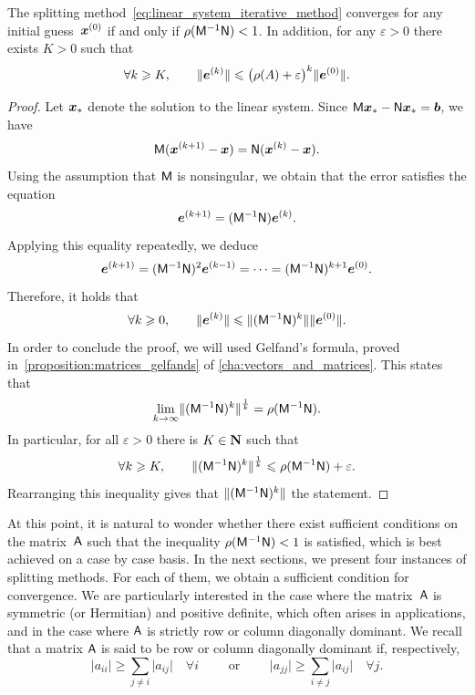 \begin{proposition}
    [Convergence]
    \label{proposition:linear_convergence}
    The splitting method~\eqref{eq:linear_system_iterative_method} converges for any initial guess~$\mathbf{\boldsymbol{x}}^{(0)}$
    if and only if $\rho(\mathsf M^{-1} \mathsf N) < 1$.
    In addition, for any $\varepsilon > 0$ there exists $K > 0$ such that
    \[
        \forall k \geqslant K,
        \qquad
        \lVert\mathbf{\boldsymbol{e}}^{(k)}\rVert \leqslant \bigl(\rho(A) + \varepsilon\bigr)^k \lVert\mathbf{\boldsymbol{e}}^{(0)}\rVert.
    \]
\end{proposition}
\begin{proof}
    Let $\mathbf{\boldsymbol{x}}_*$ denote the solution to the linear system.
    Since $\mathsf M \mathbf{\boldsymbol{x}}_* - \mathsf N \mathbf{\boldsymbol{x}}_* = \mathbf{\boldsymbol{b}}$,
    we have
    \[
        \mathsf M (\mathbf{\boldsymbol{x}}^{(k+1)} - \mathbf{\boldsymbol{x}}) = \mathsf N (\mathbf{\boldsymbol{x}}^{(k)} - \mathbf{\boldsymbol{x}}).
    \]
    Using the assumption that $\mathsf M$ is nonsingular,
    we obtain that the error satisfies the equation
    \[
        \mathbf{\boldsymbol{e}}^{(k+1)} = (\mathsf M^{-1} \mathsf N) \mathbf{\boldsymbol{e}}^{(k)}.
    \]
    Applying this equality repeatedly, we deduce
    \[
        \mathbf{\boldsymbol{e}}^{(k+1)} = (\mathsf M^{-1} \mathsf N)^2 \mathbf{\boldsymbol{e}}^{(k-1)} = \dots = (\mathsf M^{-1} \mathsf N)^{k+1} \mathbf{\boldsymbol{e}}^{(0)}.
    \]
    Therefore,
    it holds that
    \[
        \forall k \geq 0, \qquad
        \norm{\vect e^{(k)}}
        \leq \norm[bigl]{(\mat M^{-1} \mat N)^{k}} \norm{\vect e^{(0)}}.
    \]
    In order to conclude the proof,
    we will used Gelfand's formula,
    proved in~\cref{proposition:matrices_gelfands} of \cref{cha:vectors_and_matrices}.
    This states that
    \[
        \lim_{k \to \infty} \norm[bigl]{(\mat M^{-1} \mat N)^{k}}^{\frac{1}{k}} = \rho(\mat M^{-1} \mat N).
    \]
    In particular, for all $\varepsilon > 0$ there is $K \in \mathbf N$ such that
    \[
        \forall k \geq K, \qquad
        \norm[bigl]{(\mat M^{-1} \mat N)^{k}}^{\frac{1}{k}} \leq \rho(\mat M^{-1} \mat N) + \varepsilon.
    \]
    Rearranging this inequality gives that $\norm[bigl]{(\mat M^{-1} \mat N)^{k}} $ the statement.
\end{proof}

At this point,
it is natural to wonder whether there exist sufficient conditions on the matrix~$\mathsf A$ such that the inequality $\rho(\mathsf M^{-1} \mathsf N) < 1$ is satisfied,
which is best achieved on a case by case basis.
In the next sections,
we present four instances of splitting methods.
For each of them,
we obtain a sufficient condition for convergence.
We are particularly interested in the case where the matrix~$\mathsf A$ is symmetric (or Hermitian) and positive definite,
which often arises in applications,
and in the case where $\mathsf A$ is strictly row or column diagonally dominant.
We recall that a matrix $\mathsf A$ is said to be row or column diagonally dominant
if, respectively,
\[
    \lvert a_{ii} \rvert \geq \sum_{j \neq i} \lvert a_{ij} \rvert \quad \forall i
    \qquad \text{ or } \qquad
    \lvert a_{jj} \rvert \geq \sum_{i \neq j} \lvert a_{ij} \rvert \quad \forall j.
\]

